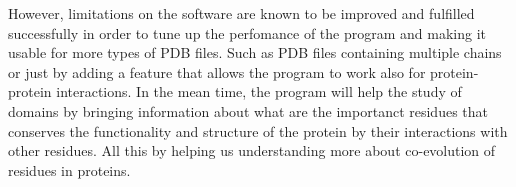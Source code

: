\documentclass[12pt]{article}
\begin{document}
However, limitations on the software are known to be improved and fulfilled successfully in order to tune up the perfomance of the program and making it usable for more types of PDB files. Such as PDB files containing multiple chains or just by adding a feature that allows the program to work also for protein-protein interactions. In the mean time, the program will help the study of domains by bringing information about what are the importanct residues that conserves the functionality and structure of the protein by their interactions with other residues. All this by helping us understanding more about co-evolution of residues in proteins. 


\clearpage
\listoffigures

\end{document}
